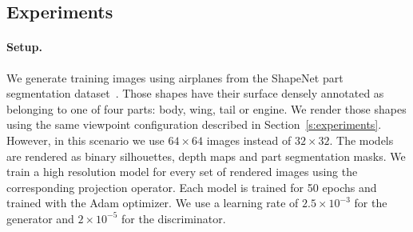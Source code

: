 \subsection{Experiments}

\paragraph{Setup.}
We generate training images using airplanes from the ShapeNet part segmentation dataset~\cite{chang2015shapenet}.
Those shapes have their surface densely annotated as belonging to one of four parts:
body, wing, tail or engine.
We render those shapes using the same viewpoint configuration described in Section~\ref{s:experiments}.
However, in this scenario we use $64\times 64$ images instead of $32\times 32$.
The models are rendered as binary silhouettes, depth maps and part segmentation masks.
We train a high resolution \prgan model for every set of rendered images using the corresponding
projection operator.
Each model is trained for 50 epochs and trained with the Adam optimizer.
We use a learning rate of $2.5 \times 10^{-3}$ for the generator and
$2 \times 10^{-5}$ for the discriminator.


